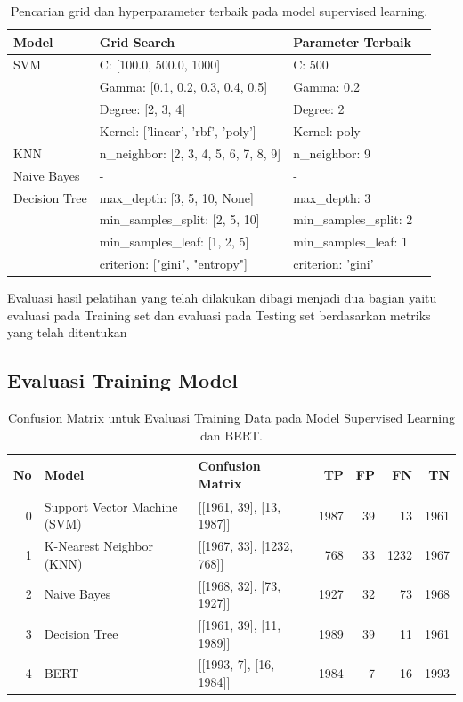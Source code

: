 \documentclass{article}\usepackage{float}
\begin{document}
\begin{table}[ht!]
\centering

\begin{tabular}{llll}
\toprule
Model & Grid Search & Parameter Terbaik \\
\midrule
SVM & C: [100.0, 500.0, 1000] & C: 500 \\
 & Gamma: [0.1, 0.2, 0.3, 0.4, 0.5] & Gamma: 0.2 \\
 & Degree: [2, 3, 4] & Degree: 2 \\
 & Kernel: ['linear', 'rbf', 'poly'] & Kernel: poly \\
\midrule
KNN & n\_neighbor: [2, 3, 4, 5, 6, 7, 8, 9] & n\_neighbor: 9 \\
\midrule
Naive Bayes & - & - \\
\midrule
Decision Tree & max\_depth: [3, 5, 10, None] & max\_depth: 3 \\
 & min\_samples\_split: [2, 5, 10] & min\_samples\_split: 2 \\
 & min\_samples\_leaf: [1, 2, 5] & min\_samples\_leaf: 1 \\
 & criterion: ["gini", "entropy"] & criterion: 'gini' \\
\bottomrule

\end{tabular}
\caption{\label{tab:Gridsearch_training} Pencarian grid dan hyperparameter terbaik pada model supervised learning.}
\end{table}

Evaluasi hasil pelatihan yang telah dilakukan dibagi menjadi dua bagian yaitu evaluasi pada Training set dan evaluasi pada Testing set berdasarkan metriks yang telah ditentukan


\subsection{Evaluasi Training Model}



\begin{table}[h!]
\centering
\begin{tabular}{r|l|l|r|r|r|r}
\toprule
No & Model                        & Confusion Matrix          & TP   & FP   & FN   & TN   \\ \midrule
0  & Support Vector Machine (SVM) & [[1961, 39], [13, 1987]]  & 1987 & 39   & 13   & 1961 \\
1  & K-Nearest Neighbor (KNN)     & [[1967, 33], [1232, 768]] & 768  & 33   & 1232 & 1967 \\
2  & Naive Bayes                  & [[1968, 32], [73, 1927]]  & 1927 & 32   & 73   & 1968 \\
3  & Decision Tree                & [[1961, 39], [11, 1989]]  & 1989 & 39   & 11   & 1961 \\
4  & BERT                         & [[1993, 7], [16, 1984]]   & 1984 & 7    & 16   & 1993 \\ \bottomrule
\end{tabular}
\caption{\label{tab:confusion_matrix_training} Confusion Matrix untuk Evaluasi Training Data pada Model Supervised Learning dan BERT.}
\end{table}
\end{document}
